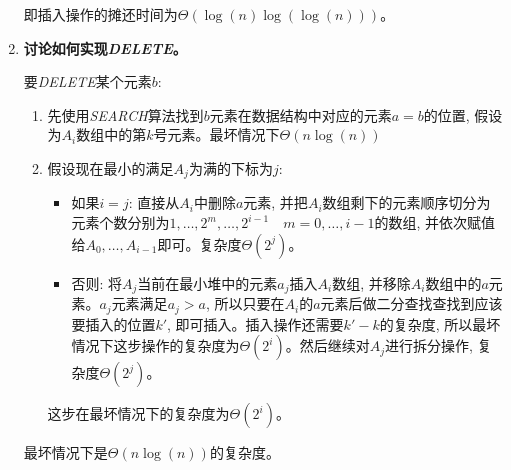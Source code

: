 \documentclass[paper=a4, fontsize=11pt]{scrartcl} %
\numberwithin{equation}{section} %
\numberwithin{figure}{section} %
\numberwithin{table}{section} %
\begin{document}
\begin{enumerate}[a]
  即插入操作的摊还时间为$\Theta(\log(n)\log(\log(n)))$。

\item \textbf{讨论如何实现\textit{DELETE}。}

  要\textit{DELETE}某个元素$b$:
  \begin{enumerate}
  \item 先使用\textit{SEARCH}算法找到$b$元素在数据结构中对应的元素$a = b$的位置, 假设为$A_i$数组中的第$k$号元素。最坏情况下$\Theta(n \log(n))$
  \item 假设现在最小的满足$A_j$为满的下标为$j$:
      \begin{itemize}
      \item 如果$i = j$: 直接从$A_i$中删除$a$元素, 并把$A_i$数组剩下的元素顺序切分为元素个数分别为$1, \dots, 2^m, \dots, 2^{i-1} \quad m = 0, \dots, i-1$的数组, 并依次赋值给$A_0, \dots, A_{i-1}$即可。复杂度$\Theta(2^j)$。
      \item 否则: 将$A_j$当前在最小堆中的元素$a_j$插入$A_i$数组, 并移除$A_i$数组中的$a$元素。$a_j$元素满足$a_j > a$, 所以只要在$A_i$的$a$元素后做二分查找查找到应该要插入的位置$k'$, 即可插入。插入操作还需要$k' - k$的复杂度, 所以最坏情况下这步操作的复杂度为$\Theta(2^i)$。然后继续对$A_j$进行拆分操作, 复杂度$\Theta(2^j)$。
      \end{itemize}
      这步在最坏情况下的复杂度为$\Theta(2^i)$。
  \end{enumerate}

  最坏情况下是$\Theta(n\log(n))$的复杂度。
\end{enumerate}
\end{document}
